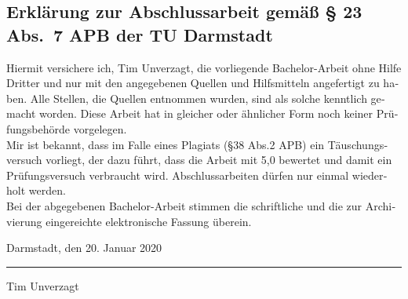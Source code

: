 \documentclass[longdoc,accentcolor=tud1b,11pt,paper=a4]{tudreport}
\title{\komTitle}
\subtitle{\komTitleTranslation \\ \komThesisType}
\newcommand{\komThesisType}{Bachelor-Arbeit\xspace}
\newcommand{\komName}{Tim Unverzagt\xspace}
\newcommand{\komSubmissionDate}{20. Januar 2020\xspace}%
\begin{document}
	
	\frenchspacing
	\raggedbottom
	\maketitle
	

    \begin{otherlanguage}{ngerman}
    \chapter*{Erklärung zur Abschlussarbeit gemäß § 23 Abs.\ 7 APB der TU Darmstadt}
    Hiermit versichere ich, \komName, die vorliegende \komThesisType ohne Hilfe Dritter und nur mit den angegebenen Quellen und Hilfsmitteln angefertigt zu haben. 
    Alle Stellen, die Quellen entnommen wurden, sind als solche kenntlich gemacht worden. 
    Diese Arbeit hat in gleicher oder ähnlicher Form noch keiner Prüfungsbehörde vorgelegen.\\

    \noindent Mir ist bekannt, dass im Falle eines Plagiats (§38 Abs.2 APB) ein Täuschungsversuch vorliegt, der dazu führt, dass die Arbeit mit 5,0 bewertet und damit ein Prüfungsversuch verbraucht wird. 
    Abschlussarbeiten dürfen nur einmal wiederholt werden.\\

    \noindent Bei der abgegebenen \komThesisType stimmen die schriftliche und die zur Archivierung eingereichte elektronische Fassung überein. 
    
    \vspace{4em}
    
    \noindent Darmstadt, den \komSubmissionDate 
    
    \vspace{3em}
    
    \noindent\rule{5cm}{0.4pt}
    
    \noindent\komName
    
    \end{otherlanguage}
    

\end{document}
